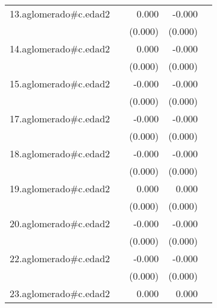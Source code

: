 {\begin{longtable}{l*{4}{D{.}{.}{-1}}}
\addlinespace
13.aglomerado#c.edad2&                     &       0.000         &      -0.000         &                     \\
            &                     &     (0.000)         &     (0.000)         &                     \\
\addlinespace
14.aglomerado#c.edad2&                     &       0.000         &      -0.000         &                     \\
            &                     &     (0.000)         &     (0.000)         &                     \\
\addlinespace
15.aglomerado#c.edad2&                     &      -0.000         &      -0.000         &                     \\
            &                     &     (0.000)         &     (0.000)         &                     \\
\addlinespace
17.aglomerado#c.edad2&                     &      -0.000         &      -0.000\sym{*}  &                     \\
            &                     &     (0.000)         &     (0.000)         &                     \\
\addlinespace
18.aglomerado#c.edad2&                     &      -0.000         &      -0.000         &                     \\
            &                     &     (0.000)         &     (0.000)         &                     \\
\addlinespace
19.aglomerado#c.edad2&                     &       0.000\sym{*}  &       0.000\sym{*}  &                     \\
            &                     &     (0.000)         &     (0.000)         &                     \\
\addlinespace
20.aglomerado#c.edad2&                     &      -0.000         &      -0.000         &                     \\
            &                     &     (0.000)         &     (0.000)         &                     \\
\addlinespace
22.aglomerado#c.edad2&                     &      -0.000         &      -0.000\sym{*}  &                     \\
            &                     &     (0.000)         &     (0.000)         &                     \\
\addlinespace
23.aglomerado#c.edad2&                     &       0.000         &       0.000         &                     \\

\end{longtable}}
